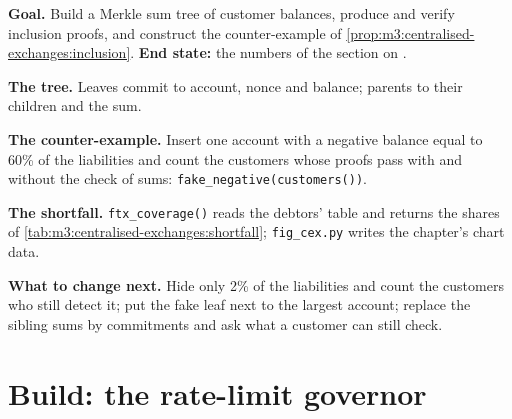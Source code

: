 \begin{tutorial}
\textbf{Goal.} Build a Merkle sum tree of customer balances, produce and verify inclusion proofs, and
construct the counter-example of \cref{prop:m3:centralised-exchanges:inclusion}. \textbf{End state:} the
numbers of the section on .
\begin{tutsteps}
\item \textbf{The tree.} Leaves commit to account, nonce and balance; parents to their children and the sum.
\label{lst:m3:centralised-exchanges:tree}
\item \textbf{The counter-example.} Insert one account with a negative balance equal to 60\% of the
liabilities and count the customers whose proofs pass with and without the check of sums:
\texttt{fake\_negative(customers())}.
\item \textbf{The shortfall.} \texttt{ftx\_coverage()} reads the debtors' table and returns the shares of
\cref{tab:m3:centralised-exchanges:shortfall}; \texttt{fig\_cex.py} writes the chapter's chart data.
\end{tutsteps}
\textbf{What to change next.} Hide only 2\% of the liabilities and count the customers who still detect it;
put the fake leaf next to the largest account; replace the sibling sums by commitments and ask what a
customer can still check.
\end{tutorial}

\section{Build: the rate-limit governor}\label{bld:m3:centralised-exchanges:ratelimit}

